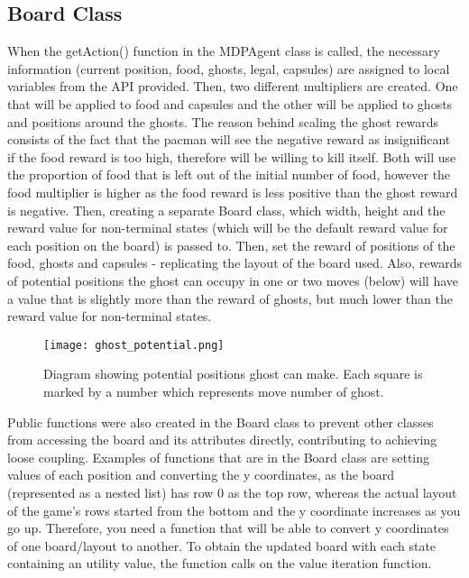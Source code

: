 \documentclass[12pt]{report}
\begin{document}
      \subsection*{Board Class}
        When the getAction() function in the MDPAgent class is called, the necessary information (current position, food, ghosts, legal, capsules) are assigned to local variables from the API provided.
        \newline \newline
        Then, two different multipliers are created. One that will be applied to food and capsules and the other will be applied to ghosts and positions around the ghosts. The reason behind scaling the ghost rewards consists of the fact that the pacman will see the negative reward as insignificant if the food reward is too high, therefore will be willing to kill itself. Both will use the proportion of food that is left out of the initial number of food, however the food multiplier is higher as the food reward is less positive than the ghost reward is negative.
        \newline \newline
        Then, creating a separate Board class, which width, height and the reward value for non-terminal states (which will be the default reward value for each position on the board) is passed to. Then, set the reward of positions of the food, ghosts and capsules - replicating the layout of the board used. Also, rewards of potential positions the ghost can occupy in one or two moves (below) will have a value that is slightly more than the reward of ghosts, but much lower than the reward value for non-terminal states.
        \begin{figure}[H]
          \centering
          \texttt{[image: ghost\_potential.png]}
          \caption{Diagram showing potential positions ghost can make. Each square is marked by a number which represents move number of ghost.}
        \end{figure}

        Public functions were also created in the Board class to prevent other classes from accessing the board and its attributes directly, contributing to achieving loose coupling. Examples of functions that are in the Board class are setting values of each position and converting the y coordinates, as the board (represented as a nested list) has row 0 as the top row, whereas the actual layout of the game's rows started from the bottom and the y coordinate increases as you go up. Therefore, you need a function that will be able to convert y coordinates of one board/layout to another.
        \newline \newline
        To obtain the updated board with each state containing an utility value, the function calls on the value iteration function.
\end{document}
